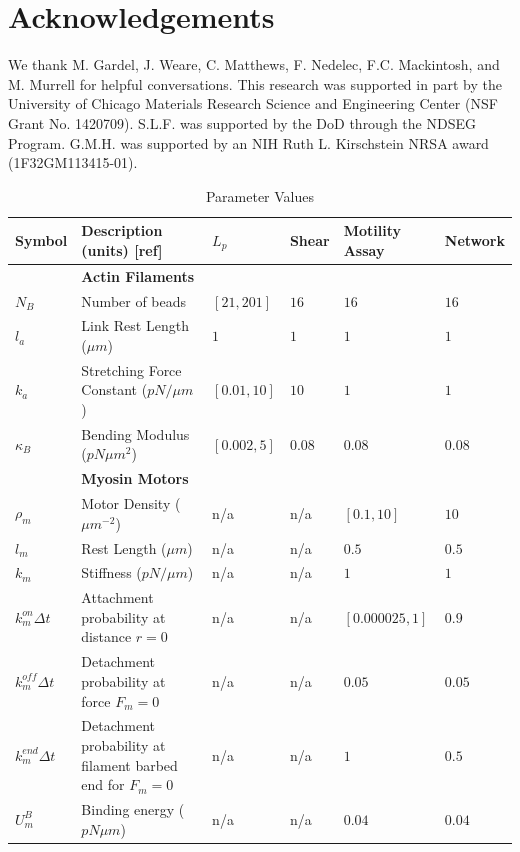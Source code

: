 \documentclass[12pt]{article}
\newcommand{\beginsupplement}{%
  \setcounter{table}{0}
  \renewcommand{\thetable}{S\arabic{table}}%
  \setcounter{figure}{0}
  \renewcommand{\thefigure}{S\arabic{figure}}%
}
\begin{document}
\section{Acknowledgements}  
We thank M. Gardel, J. Weare, C. Matthews, F. Nedelec, F.C. Mackintosh, and M. Murrell for helpful conversations. 
This research was supported in part by the
University of Chicago Materials Research Science and Engineering Center
(NSF Grant No. 1420709). S.L.F. was supported by the DoD
through the NDSEG Program. G.M.H. was supported by an NIH Ruth L. Kirschstein
NRSA award (1F32GM113415-01).



\beginsupplement
\begin{table}
  \caption{Parameter Values}
  \centering
  \begin{tabular}{|C{1.5cm}|L{7cm}|C{1.5cm}|C{1.5cm}|C{2cm}|C{1.5cm}|}
    \hline\hline
    Symbol & Description (units) [ref] & $L_p$ & Shear & Motility Assay & Network \\
    \hline
    &\bf{Actin Filaments}& & & &\\
    \hline
    $N_B$ & Number of beads & $[21,201]$ & $16$ & $16$ & $16$\\
    $l_a$ & Link Rest Length ($\mu m$)\cite{odijk1983}& $1$ & $1$ & $1$ & $1$\\
    $k_a$ & Stretching Force Constant ($pN/\mu m$) & $[0.01,10]$ & $10$ & $1$ &$1$\\
    $\kappa_B$ & Bending Modulus ($pN\mu m^2$)\cite{ott1993} & $[0.002,5] $ & $0.08$ & $0.08$ &$0.08$\\
    \hline
    &\bf{Myosin Motors}& & & &\\
    \hline
    $\rho_m$ & Motor Density ($\mu m^{-2}$) & n/a & n/a & $[0.1,10]$ & $10$ \\
    $l_m$ & Rest Length ($\mu m$)\cite{niederman1975} & n/a & n/a & $0.5$ & $0.5$ \\
    $k_m$ & Stiffness ($pN/\mu m$)& n/a & n/a & $1$ & $1$\\
    $k^{on}_m\Delta t$ & Attachment probability at distance $r=0$& n/a & n/a &$[0.000025, 1]$ & $0.9$\\
    $k^{off}_m\Delta t$ & Detachment probability at force $F_{m}=0$& n/a & n/a & $0.05$ & $0.05$\\
    $k^{end}_m\Delta t$ & Detachment probability at filament barbed end for $F_m=0$ & n/a & n/a & $1$ & $0.5$ \\
    $U_m^B$ & Binding energy ($pN\mu m$)& n/a & n/a & $0.04$ & $0.04$\\

\end{tabular}
\end{table}
\end{document}
